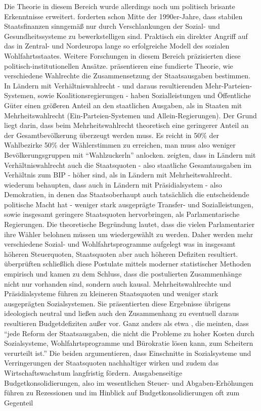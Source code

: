 Die Theorie in diesem Bereich wurde allerdings noch um politisch brisante Erkenntnisse erweitert. \textcite{Perotti1996, Perotti1995, Perotti1997} forderten schon Mitte der 1990er-Jahre, dass stabilen Staatsfinanzen sinngemäß nur durch Verschlankungen der Sozial- und Gesundheitssysteme zu bewerkstelligen sind. Praktisch ein direkter Angriff auf das in Zentral- und Nordeuropa lange so erfolgreiche Modell des sozialen Wohlfahrtsstaates. Weitere Forschungen in diesem Bereich präzisierten diese politisch-institutionellen Ansätze. \textcite{Persson1999} präsentieren eine fundierte Theorie, wie verschiedene Wahlrechte die Zusammensetzung der Staatsausgaben bestimmen. In Ländern mit  Verhältniswahlrecht - und daraus resultierenden Mehr-Parteien-Systemen, sowie Koalitionsregierungen - haben Sozialleistungen und Öffentliche Güter einen größeren Anteil an den staatlichen Ausgaben, als in Staaten mit Mehrheitswahlrecht (Ein-Parteien-Systemen und Allein-Regierungen). Der Grund liegt darin, dass beim Mehrheitswahlrecht theoretisch eine geringerer Anteil an der Gesamtbevölkerung überzeugt werden muss. Es reicht in 50\% der Wahlbezirke 50\% der Wählerstimmen zu erreichen, man muss also weniger Bevölkerungsgruppen mit "`Wahlzuckerln"' anlocken. \textcite[S. 648]{Milesi2002} zeigten, dass in Ländern mit Verhältniswahlrecht auch die Staatsquoten - also staatliche Gesamtausgaben im Verhältnis zum BIP - höher sind, als in Ländern mit Mehrheitswahlrecht. \textcite{Persson2000} wiederum behaupten, dass auch in Ländern mit Präsidialsystem - also Demokratien, in denen das Staatsoberhaupt auch tatsächlich die entscheidende politische Macht hat - weniger stark ausgeprägte Transfer- und Sozialleistungen, sowie insgesamt geringere Staatsquoten hervorbringen, als Parlamentarische Regierungen. Die theoretische Begründung lautet, dass die vielen Parlamentarier ihre Wähler belohnen müssen um wiedergewählt zu werden. Daher werden mehr verschiedene Sozial- und Wohlfahrtsprogramme aufgelegt was in insgesamt höheren Steuerquoten, Staatsquoten aber auch höheren Defiziten resultiert. \textcite[S. 42]{Persson2004} überprüften schließlich diese Postulate mittels moderner statistischer Methoden empirisch und kamen zu dem Schluss, dass die postulierten Zusammenhänge nicht nur vorhanden sind, sondern auch kausal. Mehrheitswahlrechte und Präsidialsysteme führen zu kleineren Staatsquoten und weniger stark ausgeprägten Sozialsystemen. Sie präsentierten diese Ergebnisse übrigens ideologisch neutral und ließen auch den Zusammenhang zu eventuell daraus resultieren Budgetdefiziten außer vor. Ganz anders als etwa \textcite[S. 248]{Perotti1997}, die meinten, dass "`jede Reform der Staatsausgaben, die nicht die Probleme zu hoher Kosten durch Sozialsysteme, Wohlfahrtsprogramme und Bürokratie lösen kann, zum Scheitern verurteilt ist."' Die beiden argumentieren, dass Einschnitte in Sozialsysteme und Verringerungen der Staatsquoten nachhaltiger wirken und zudem das Wirtschaftswachstum langfristig fördern. Ausgabenseitige Budgetkonsolidierungen, also im wesentlichen Steuer- und Abgaben-Erhöhungen führen zu Rezessionen und im Hinblick auf Budgetkonsolidierungen oft zum Gegenteil \parencite[S. 212]{Perotti1997}


